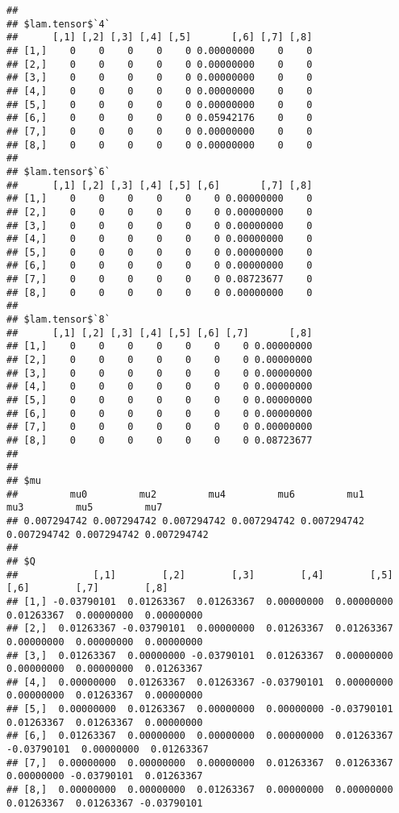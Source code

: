 \documentclass[
]{article}
\begin{document}
\begin{verbatim}
## 
## $lam.tensor$`4`
##      [,1] [,2] [,3] [,4] [,5]       [,6] [,7] [,8]
## [1,]    0    0    0    0    0 0.00000000    0    0
## [2,]    0    0    0    0    0 0.00000000    0    0
## [3,]    0    0    0    0    0 0.00000000    0    0
## [4,]    0    0    0    0    0 0.00000000    0    0
## [5,]    0    0    0    0    0 0.00000000    0    0
## [6,]    0    0    0    0    0 0.05942176    0    0
## [7,]    0    0    0    0    0 0.00000000    0    0
## [8,]    0    0    0    0    0 0.00000000    0    0
## 
## $lam.tensor$`6`
##      [,1] [,2] [,3] [,4] [,5] [,6]       [,7] [,8]
## [1,]    0    0    0    0    0    0 0.00000000    0
## [2,]    0    0    0    0    0    0 0.00000000    0
## [3,]    0    0    0    0    0    0 0.00000000    0
## [4,]    0    0    0    0    0    0 0.00000000    0
## [5,]    0    0    0    0    0    0 0.00000000    0
## [6,]    0    0    0    0    0    0 0.00000000    0
## [7,]    0    0    0    0    0    0 0.08723677    0
## [8,]    0    0    0    0    0    0 0.00000000    0
## 
## $lam.tensor$`8`
##      [,1] [,2] [,3] [,4] [,5] [,6] [,7]       [,8]
## [1,]    0    0    0    0    0    0    0 0.00000000
## [2,]    0    0    0    0    0    0    0 0.00000000
## [3,]    0    0    0    0    0    0    0 0.00000000
## [4,]    0    0    0    0    0    0    0 0.00000000
## [5,]    0    0    0    0    0    0    0 0.00000000
## [6,]    0    0    0    0    0    0    0 0.00000000
## [7,]    0    0    0    0    0    0    0 0.00000000
## [8,]    0    0    0    0    0    0    0 0.08723677
## 
## 
## $mu
##         mu0         mu2         mu4         mu6         mu1         mu3         mu5         mu7 
## 0.007294742 0.007294742 0.007294742 0.007294742 0.007294742 0.007294742 0.007294742 0.007294742 
## 
## $Q
##             [,1]        [,2]        [,3]        [,4]        [,5]        [,6]        [,7]        [,8]
## [1,] -0.03790101  0.01263367  0.01263367  0.00000000  0.00000000  0.01263367  0.00000000  0.00000000
## [2,]  0.01263367 -0.03790101  0.00000000  0.01263367  0.01263367  0.00000000  0.00000000  0.00000000
## [3,]  0.01263367  0.00000000 -0.03790101  0.01263367  0.00000000  0.00000000  0.00000000  0.01263367
## [4,]  0.00000000  0.01263367  0.01263367 -0.03790101  0.00000000  0.00000000  0.01263367  0.00000000
## [5,]  0.00000000  0.01263367  0.00000000  0.00000000 -0.03790101  0.01263367  0.01263367  0.00000000
## [6,]  0.01263367  0.00000000  0.00000000  0.00000000  0.01263367 -0.03790101  0.00000000  0.01263367
## [7,]  0.00000000  0.00000000  0.00000000  0.01263367  0.01263367  0.00000000 -0.03790101  0.01263367
## [8,]  0.00000000  0.00000000  0.01263367  0.00000000  0.00000000  0.01263367  0.01263367 -0.03790101
\end{verbatim}
\end{document}
